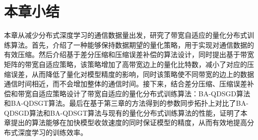 \begin{table}[!htbp]
    \center
    \caption{ 有梯度跟踪的算法的测试准确率达到85\%所需的时间（s）}  %
    \label{tab:SGT-accuracy-time}  %
\end{table}

\section{本章小结}
本章从减少分布式深度学习的通信数据量出发，研究了带宽自适应的量化分布式训练算法。首先，介绍了一种能够保持数据期望的量化策略，用于实现对通信数据的有效压缩。然后介绍基于差分压缩和压缩误差补偿的算法设计，同时提出基于带宽矩阵的带宽自适应策略，该策略增加了高带宽边上的量化比特数，减小了对应的压缩误差，从而降低了量化对模型精度的影响，同时该策略使不同带宽的边上的数据通信时间相近，而不会增加整体的通信时间。接下来，结合差分压缩、压缩误差补偿和带宽自适应策略设计了带宽自适应的量化分布式训练算法：BA-QDSGD算法和BA-QDSGT算法。最后在基于第三章的方法得到的参数同步拓扑上对比了BA-QDSGD算法和BA-QDSGT算法与现有的量化分布式训练算法的性能，证明了本章提出的算法能够在加快模型收敛速度的同时保证模型的精度，从而有效地提高分布式深度学习的训练效率。

